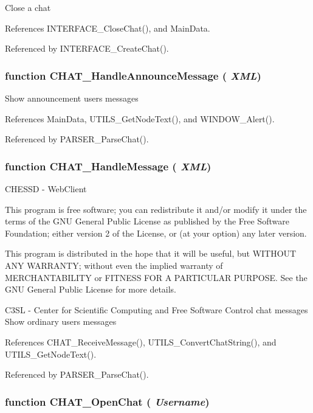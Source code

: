 Close a chat 

References INTERFACE\_\-CloseChat(), and MainData.

Referenced by INTERFACE\_\-CreateChat().
\subsubsection{\setlength{\rightskip}{0pt plus 5cm}function CHAT\_\-HandleAnnounceMessage ( {\em XML})}\label{chat_2chat_8js_615cd2e1ca89c4ebdf2708271d41f68d}


Show announcement users messages 

References MainData, UTILS\_\-GetNodeText(), and WINDOW\_\-Alert().

Referenced by PARSER\_\-ParseChat().
\subsubsection{\setlength{\rightskip}{0pt plus 5cm}function CHAT\_\-HandleMessage ( {\em XML})}\label{chat_2chat_8js_1aabd0a9c0e5dd585f17ef11a3fa91ab}


CHESSD - WebClient

This program is free software; you can redistribute it and/or modify it under the terms of the GNU General Public License as published by the Free Software Foundation; either version 2 of the License, or (at your option) any later version.

This program is distributed in the hope that it will be useful, but WITHOUT ANY WARRANTY; without even the implied warranty of MERCHANTABILITY or FITNESS FOR A PARTICULAR PURPOSE. See the GNU General Public License for more details.

C3SL - Center for Scientific Computing and Free Software Control chat messages Show ordinary users messages 

References CHAT\_\-ReceiveMessage(), UTILS\_\-ConvertChatString(), and UTILS\_\-GetNodeText().

Referenced by PARSER\_\-ParseChat().
\subsubsection{\setlength{\rightskip}{0pt plus 5cm}function CHAT\_\-OpenChat ( {\em Username})}\label{chat_2chat_8js_9750e8d94926a232f70cfac576e96850}


